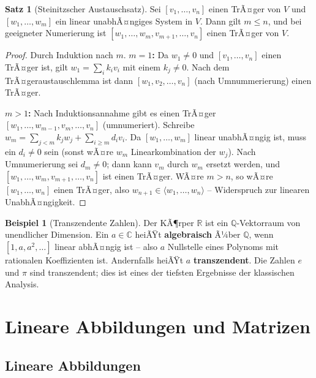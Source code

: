 ﻿\documentclass[a4paper,12pt]{report}
\theoremstyle{definition}
\newtheorem{beispiel}{Beispiel}
\newtheorem{satz}{Satz}
\begin{document}
\begin{satz}[Steinitzscher Austauschsatz]
    Sei $[v_1, \dots, v_n]$ einen TrÃ¤ger von $V$ und $[w_1, \dots, w_m]$ ein
    linear unabhÃ¤ngiges System in $V$. Dann gilt $m \le n$, und bei geeigneter
    Numerierung ist $[w_1, \dots, w_m, v_{m+1}, \dots, v_n]$ einen TrÃ¤ger von $V$.
\end{satz}
\begin{proof}
    Durch Induktion nach $m$. \textbf{$m = 1$:} Da $w_1 \neq 0$ und $[v_1, \ldots, v_n]$
    einen TrÃ¤ger ist, gilt $w_1 = \sum_i k_i v_i$ mit einem $k_j \neq 0$.
    Nach dem TrÃ¤geraustauschlemma ist dann $[w_1, v_2, \ldots, v_n]$ (nach Umnummerierung)
    einen TrÃ¤ger.

    \textbf{$m > 1$:} Nach Induktionsannahme gibt es einen TrÃ¤ger
    $[w_1, \ldots, w_{m-1}, v_m, \ldots, v_n]$ (umnumeriert). Schreibe
    $w_m = \sum_{j<m} k_j w_j + \sum_{i \geq m} d_i v_i$.
    Da $[w_1, \ldots, w_m]$ linear unabhÃ¤ngig ist, muss ein $d_i \neq 0$ sein
    (sonst wÃ¤re $w_m$ Linearkombination der $w_j$). Nach Umnumerierung sei
    $d_m \neq 0$; dann kann $v_m$ durch $w_m$ ersetzt werden, und
    $[w_1, \ldots, w_m, v_{m+1}, \ldots, v_n]$ ist einen TrÃ¤ger.
    WÃ¤re $m > n$, so wÃ¤re $[w_1, \ldots, w_n]$ einen TrÃ¤ger, also $w_{n+1}
    \in \langle w_1, \ldots, w_n \rangle$ -- Widerspruch zur linearen UnabhÃ¤ngigkeit.
\end{proof}


\begin{beispiel}[Transzendente Zahlen]
    Der KÃ¶rper $\mathbb{R}$ ist ein $\mathbb{Q}$-Vektorraum von unendlicher
    Dimension. Ein $a \in \mathbb{C}$ heiÃŸt \textbf{algebraisch} Ã¼ber $\mathbb{Q}$,
    wenn $[1, a, a^2, \dots]$ linear abhÃ¤ngig ist -- also $a$ Nullstelle eines
    Polynoms mit rationalen Koeffizienten ist. Andernfalls heiÃŸt $a$
    \textbf{transzendent}. Die Zahlen $e$ und $\pi$ sind transzendent;
    dies ist eines der tiefsten Ergebnisse der klassischen Analysis.
\end{beispiel}

\chapter{Lineare Abbildungen und Matrizen}

\section{Lineare Abbildungen}
\end{document}
